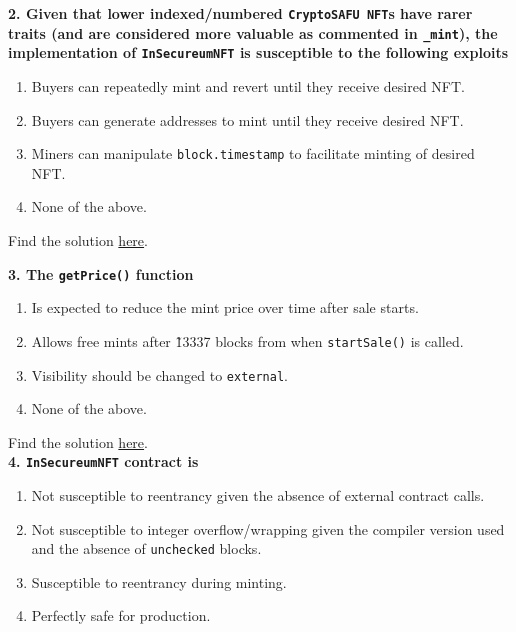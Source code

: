 \textbf{2. Given that lower indexed/numbered \texttt{CryptoSAFU NFT}s have rarer traits (and are considered more valuable as commented in \texttt{\_mint}), the implementation of \texttt{InSecureumNFT} is susceptible to the following exploits}

\begin{enumerate}[label=\Alph*.]
    \item Buyers can repeatedly mint and revert until they receive desired NFT.
    \item Buyers can generate addresses to mint until they receive desired NFT.
    \item Miners can manipulate \verb|block.timestamp| to facilitate minting of desired NFT.
    \item None of the above.
\end{enumerate}

Find the solution \hyperref[sec:exam8_q2]{here}.\\

\pagebreak

\textbf{3. The \texttt{getPrice()} function}

\begin{enumerate}[label=\Alph*.]
    \item Is expected to reduce the mint price over time after sale starts.
    \item Allows free mints after \~ 13337 blocks from when \verb|startSale()| is called.
    \item Visibility should be changed to \verb|external|.
    \item None of the above.
\end{enumerate}

Find the solution \hyperref[sec:exam8_q3]{here}.\\

\textbf{4. \texttt{InSecureumNFT} contract is}

\begin{enumerate}[label=\Alph*.]
    \item Not susceptible to reentrancy given the absence of external contract calls.
    \item Not susceptible to integer overflow/wrapping given the compiler version used and the absence of \verb|unchecked| blocks.
    \item Susceptible to reentrancy during minting.
    \item Perfectly safe for production.
\end{enumerate}


